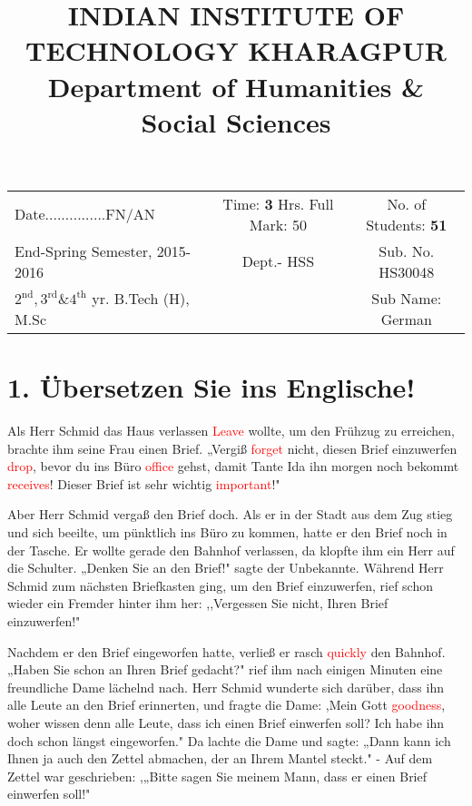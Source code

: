 \documentclass[12pt]{article}
\title{
INDIAN INSTITUTE OF TECHNOLOGY KHARAGPUR \\ Department of Humanities \& Social Sciences
}
\date{}
\begin{document}
\maketitle

\begin{tabular}{lcc} 
Date...............FN/AN & Time: \textbf{3} Hrs. Full Mark: 50 & No. of Students: \textbf{51} \\
End-Spring Semester, 2015-2016 & Dept.- HSS & Sub. No. HS30048 \\
$2^{\text{nd}}, 3^{\text{rd}} \& 4^{\text{th}}$ yr. B.Tech (H), M.Sc & & Sub Name: German \\
\end{tabular}

\vspace{1em}

\section*{1. Übersetzen Sie ins Englische!}

Als Herr Schmid das Haus verlassen \textcolor{red}{Leave} wollte, um den Frühzug zu erreichen, brachte ihm seine Frau einen Brief. „Vergiß \textcolor{red}{forget} nicht, diesen Brief einzuwerfen \textcolor{red}{drop}, bevor du ins Büro \textcolor{red}{office} gehst, damit Tante Ida ihn morgen noch bekommt \textcolor{red}{receives}! Dieser Brief ist sehr wichtig \textcolor{red}{important}!"

Aber Herr Schmid vergaß den Brief doch. Als er in der Stadt aus dem Zug stieg und sich beeilte, um pünktlich ins Büro zu kommen, hatte er den Brief noch in der Tasche. Er wollte gerade den Bahnhof verlassen, da klopfte ihm ein Herr auf die Schulter. „Denken Sie an den Brief!" sagte der Unbekannte. Während Herr Schmid zum nächsten Briefkasten ging, um den Brief einzuwerfen, rief schon wieder ein Fremder hinter ihm her: ,,Vergessen Sie nicht, Ihren Brief einzuwerfen!"

Nachdem er den Brief eingeworfen hatte, verließ er rasch \textcolor{red}{quickly} den Bahnhof. „Haben Sie schon an Ihren Brief gedacht?" rief ihm nach einigen Minuten eine freundliche Dame lächelnd nach. Herr Schmid wunderte sich darüber, dass ihn alle Leute an den Brief erinnerten, und fragte die Dame: ,Mein Gott \textcolor{red}{goodness}, woher wissen denn alle Leute, dass ich einen Brief einwerfen soll? Ich habe ihn doch schon längst eingeworfen." Da lachte die Dame und sagte: „Dann kann ich Ihnen ja auch den Zettel abmachen, der an Ihrem Mantel steckt." - Auf dem Zettel war geschrieben: ,„Bitte sagen Sie meinem Mann, dass er einen Brief einwerfen soll!"
\end{document}
